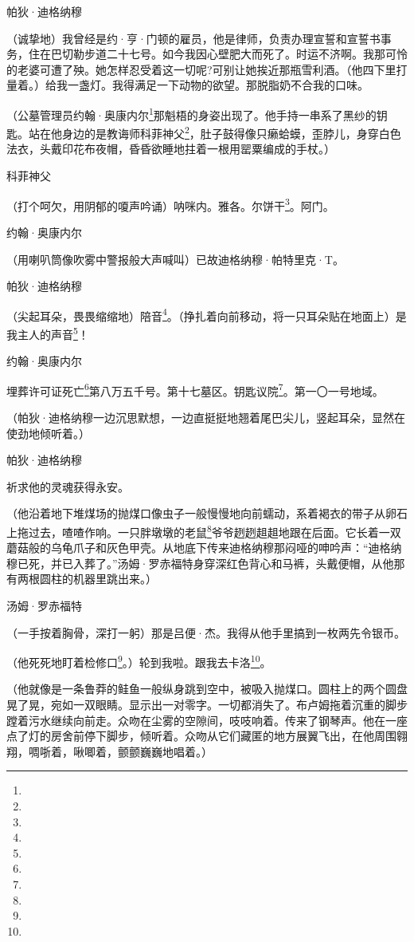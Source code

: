 \par 帕狄·迪格纳穆
\par （诚挚地）我曾经是约·亨·门顿的雇员，他是律师，负责办理宣誓和宣誓书事务，住在巴切勒步道二十七号。如今我因心壁肥大而死了。时运不济啊。我那可怜的老婆可遭了殃。她怎样忍受着这一切呢?可别让她挨近那瓶雪利酒。（他四下里打量着。）给我一盏灯。我得满足一下动物的欲望。那脱脂奶不合我的口味。
\par （公墓管理员约翰·奥康内尔\footnote{}那魁梧的身姿出现了。他手持一串系了黑纱的钥匙。站在他身边的是教诲师科菲神父\footnote{}，肚子鼓得像只癞蛤蟆，歪脖儿，身穿白色法衣，头戴印花布夜帽，昏昏欲睡地拄着一根用罂粟编成的手杖。）
\par 科菲神父
\par （打个呵欠，用阴郁的嗄声吟诵）呐咪内。雅各。尔饼干\footnote{}。阿门。
\par 约翰·奥康内尔
\par （用喇叭筒像吹雾中警报般大声喊叫）已故迪格纳穆·帕特里克·T。
\par 帕狄·迪格纳穆
\par （尖起耳朵，畏畏缩缩地）陪音\footnote{}。（挣扎着向前移动，将一只耳朵贴在地面上）是我主人的声音\footnote{}！
\par 约翰·奥康内尔
\par 埋葬许可证死亡\footnote{}第八万五千号。第十七墓区。钥匙议院\footnote{}。第一〇一号地域。
\par （帕狄·迪格纳穆一边沉思默想，一边直挺挺地翘着尾巴尖儿，竖起耳朵，显然在使劲地倾听着。）
\par 帕狄·迪格纳穆
\par 祈求他的灵魂获得永安。
\par （他沿着地下堆煤场的抛煤口像虫子一般慢慢地向前蠕动，系着褐衣的带子从卵石上拖过去，喳喳作响。一只胖墩墩的老鼠\footnote{}爷爷趔趔趄趄地跟在后面。它长着一双蘑菇般的乌龟爪子和灰色甲壳。从地底下传来迪格纳穆那闷哑的呻吟声：“迪格纳穆已死，并已入葬了。”汤姆·罗赤福特身穿深红色背心和马裤，头戴便帽，从他那有两根圆柱的机器里跳出来。）
\par 汤姆·罗赤福特
\par （一手按着胸骨，深打一躬）那是吕便·杰。我得从他手里搞到一枚两先令银币。
\par （他死死地盯着检修口\footnote{}。）轮到我啦。跟我去卡洛\footnote{}。
\par （他就像是一条鲁莽的鲑鱼一般纵身跳到空中，被吸入抛煤口。圆柱上的两个圆盘晃了晃，宛如一双眼睛。显示出一对零字。一切都消失了。布卢姆拖着沉重的脚步蹚着污水继续向前走。众吻在尘雾的空隙间，吱吱响着。传来了钢琴声。他在一座点了灯的房舍前停下脚步，倾听着。众吻从它们藏匿的地方展翼飞出，在他周围翱翔，啁哳着，啾唧着，颤颤巍巍地唱着。）
